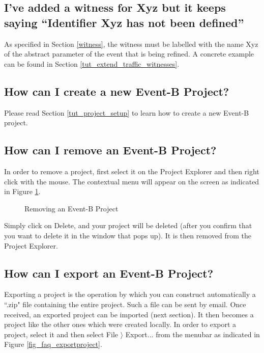 \subsection{I've added a witness for \textsf{Xyz} but it keeps saying ``Identifier \textsf{Xyz} has not been defined''}

As specified in Section \ref{witness}, the witness must be labelled with the name \textsf{Xyz} of the abstract parameter of the event that is being refined. A concrete example can be found in Section \ref{tut_extend_traffic_witnesses}.

\subsection{How can I create a new Event-B Project?}

Please read Section \ref{tut_project_setup} to learn how to create a new Event-B project.

\subsection{How can I remove an Event-B Project?}

In order to remove a project, first select it on the \textsf{Project Explorer} and then right click with the mouse. The contextual menu will appear on the screen as indicated in Figure \ref{fig_faq_removeproject}.

\begin{figure}[!ht]
\begin{center}
	\caption{Removing an Event-B Project}
	\label{fig_faq_removeproject}
\end{center}
\end{figure}

Simply click on \textsf{Delete}, and your project will be deleted (after you confirm that you want to delete it in the window that pops up). It is then removed from the \textsf{Project Explorer}.

\subsection{How can I export an Event-B Project?}

Exporting a project is the operation by which you can construct automatically a ``.zip" file containing the entire project. Such a file can be sent by email. Once received, an exported project can be imported (next section). It then becomes a project like the other ones which were created locally. In order to export a project, select it and then select \textsf{File $\rangle$ Export...} from the menubar as indicated in Figure \ref{fig_faq_exportproject}. 

